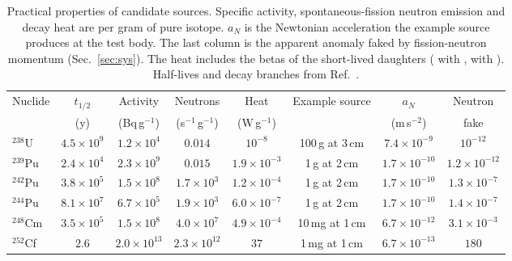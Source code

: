 \begin{table}[!htbp]
\caption{\label{tab:practical}Practical properties of candidate sources. Specific activity, spontaneous-fission
neutron emission and decay heat are per gram of pure isotope. $a_N$ is the Newtonian acceleration the example
source produces at the test body. The last column is the apparent anomaly faked by fission-neutron momentum
(Sec.~\ref{sec:sys}). The heat includes the betas of the short-lived daughters ( with ,
 with ). Half-lives and decay branches from Ref.~\cite{Kondev2021}.}
\begin{ruledtabular}
\begin{tabular}{lccccccc}
Nuclide & $t_{1/2}$ & Activity & Neutrons & Heat & Example source & $a_N$ & Neutron\\
 & (y) & (Bq\,g$^{-1}$) & (s$^{-1}$\,g$^{-1}$) & (W\,g$^{-1}$) & & (m\,s$^{-2}$) & fake\\
\hline
$^{238}$U & $4.5\times10^{9}$ & $1.2\times10^{4}$ & $0.014$ & $10^{-8}$ & 100\,g at 3\,cm & $7.4\times10^{-9}$ & $10^{-12}$ \\
$^{239}$Pu & $2.4\times10^{4}$ & $2.3\times10^{9}$ & $0.015$ & $1.9\times10^{-3}$ & 1\,g at 2\,cm & $1.7\times10^{-10}$ & $1.2\times10^{-12}$ \\
$^{242}$Pu & $3.8\times10^{5}$ & $1.5\times10^{8}$ & $1.7\times10^{3}$ & $1.2\times10^{-4}$ & 1\,g at 2\,cm & $1.7\times10^{-10}$ & $1.3\times10^{-7}$ \\
$^{244}$Pu & $8.1\times10^{7}$ & $6.7\times10^{5}$ & $1.9\times10^{3}$ & $6.0\times10^{-7}$ & 1\,g at 2\,cm & $1.7\times10^{-10}$ & $1.4\times10^{-7}$ \\
$^{248}$Cm & $3.5\times10^{5}$ & $1.5\times10^{8}$ & $4.0\times10^{7}$ & $4.9\times10^{-4}$ & 10\,mg at 1\,cm & $6.7\times10^{-12}$ & $3.1\times10^{-3}$ \\
$^{252}$Cf & $2.6$ & $2.0\times10^{13}$ & $2.3\times10^{12}$ & $37$ & 1\,mg at 1\,cm & $6.7\times10^{-13}$ & $180$ \\
\end{tabular}
\end{ruledtabular}
\end{table}
